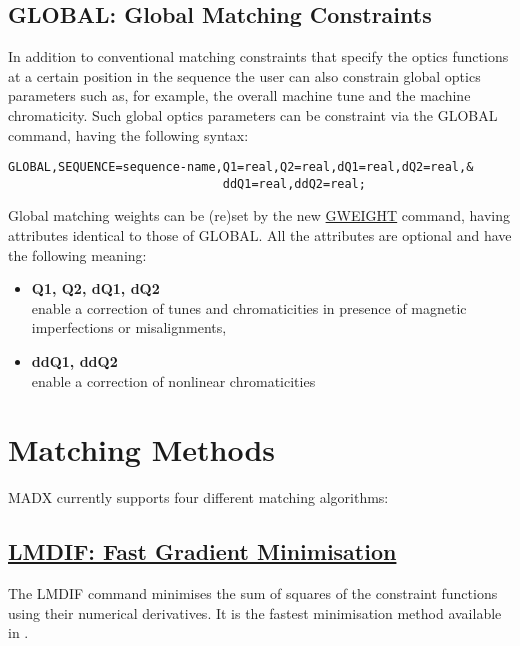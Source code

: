 \subsection{GLOBAL: Global Matching Constraints}
\label{subsec:match_con_global}

In addition to conventional matching constraints that specify the optics 
functions at a certain position in the sequence the user can also constrain 
global optics parameters such as, for example, the overall machine tune
and the machine chromaticity. Such global optics parameters can be
constraint via the  GLOBAL command, having the following syntax:

\begin{verbatim}
GLOBAL,SEQUENCE=sequence-name,Q1=real,Q2=real,dQ1=real,dQ2=real,&
                              ddQ1=real,ddQ2=real;
\end{verbatim}

Global matching weights can be (re)set by the new 
\href{gweight}{GWEIGHT} command, having attributes identical to those of
GLOBAL. 
All the attributes are optional and have the following meaning:
\begin{itemize}
  \item {\bf Q1, Q2, dQ1, dQ2} \\
    enable a correction of tunes and chromaticities in presence of
    magnetic imperfections or misalignments, 
  \item {\bf ddQ1, ddQ2} \\
    enable a correction of nonlinear chromaticities
\end{itemize}


%

\section{Matching Methods}
\label{sec:match_methods}

MADX currently supports four different matching algorithms: 

\subsection{\href{lmdif}{LMDIF: Fast Gradient Minimisation}} 	
\label{subsec:match_lmdif}
The LMDIF command minimises the sum of squares of the constraint
functions using their numerical derivatives. It is the fastest
minimisation method available in \madx.    
 
